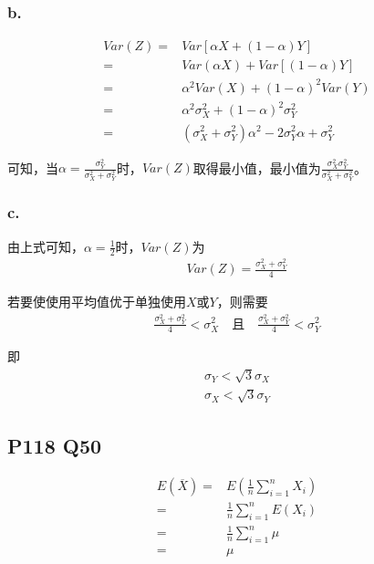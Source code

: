\documentclass[a4paper,12pt]{ctexart}
\begin{document}
\subsubsection*{b.}

\begin{align*}
	Var(Z) =& Var[\alpha X + (1 - \alpha) Y] \\
	       =& Var(\alpha X) + Var[(1 - \alpha) Y] \\
		   =& \alpha^2 Var(X) + (1 - \alpha)^2 Var(Y) \\
		   =& \alpha^2 \sigma_X^2 + (1 - \alpha)^2 \sigma_Y^2 \\
		   =& (\sigma_X^2 + \sigma_Y^2) \alpha^2 - 2 \sigma_Y^2 \alpha + \sigma_Y^2
\end{align*}

可知，当$\alpha = \frac{\sigma_Y^2}{\sigma_X^2 + \sigma_Y^2}$时，$Var(Z)$取得最小值，最小值为$\frac{\sigma_X^2 \sigma_Y^2}{\sigma_X^2 + \sigma_Y^2}$。

\subsubsection*{c.}

由上式可知，$\alpha = \frac{1}{2}$时，$Var(Z)$为
\begin{align*}
	Var(Z) = \frac{\sigma_X^2 + \sigma_Y^2}{4}
\end{align*}

若要使使用平均值优于单独使用$X$或$Y$，则需要
\begin{align*}
	\frac{\sigma_X^2 + \sigma_Y^2}{4} < \sigma_X^2 \quad \text{且} \quad \frac{\sigma_X^2 + \sigma_Y^2}{4} < \sigma_Y^2
\end{align*}

即
\begin{align*}
	\sigma_Y < \sqrt{3} \sigma_X \\
	\sigma_X < \sqrt{3} \sigma_Y
\end{align*}

\subsection*{P118 Q50}

\begin{align*}
	E(\overline{X}) =& E\left(\frac{1}{n} \sum_{i = 1}^{n} X_i\right) \\
	                =& \frac{1}{n} \sum_{i = 1}^{n} E(X_i) \\
					=& \frac{1}{n} \sum_{i = 1}^{n} \mu \\
					=& \mu
\end{align*}
\end{document}
